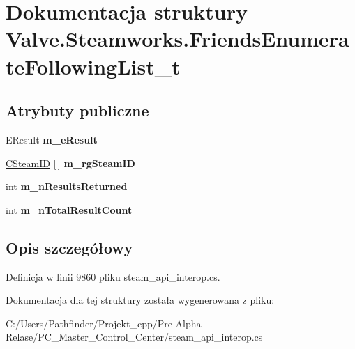 \hypertarget{struct_valve_1_1_steamworks_1_1_friends_enumerate_following_list__t}{}\section{Dokumentacja struktury Valve.\+Steamworks.\+Friends\+Enumerate\+Following\+List\+\_\+t}
\label{struct_valve_1_1_steamworks_1_1_friends_enumerate_following_list__t}
\subsection*{Atrybuty publiczne}
\begin{DoxyCompactItemize}
\item 
\mbox{\label{struct_valve_1_1_steamworks_1_1_friends_enumerate_following_list__t_a4df396a8006174ea889b055974002ef2}} 
E\+Result {\bfseries m\+\_\+e\+Result}
\item 
\mbox{\label{struct_valve_1_1_steamworks_1_1_friends_enumerate_following_list__t_a324b586ea14c2cfd6e8ed8ad3388a892}} 
\hyperlink{struct_valve_1_1_steamworks_1_1_c_steam_i_d}{C\+Steam\+ID} \mbox{[}$\,$\mbox{]} {\bfseries m\+\_\+rg\+Steam\+ID}
\item 
\mbox{\label{struct_valve_1_1_steamworks_1_1_friends_enumerate_following_list__t_ae61a7696e5eb693a8b56d9fb8a21a2bf}} 
int {\bfseries m\+\_\+n\+Results\+Returned}
\item 
\mbox{\label{struct_valve_1_1_steamworks_1_1_friends_enumerate_following_list__t_a6da1f048def18101678e861824ad9c5d}} 
int {\bfseries m\+\_\+n\+Total\+Result\+Count}
\end{DoxyCompactItemize}


\subsection{Opis szczegółowy}


Definicja w linii 9860 pliku steam\+\_\+api\+\_\+interop.\+cs.



Dokumentacja dla tej struktury została wygenerowana z pliku\+:\begin{DoxyCompactItemize}
\item 
C\+:/\+Users/\+Pathfinder/\+Projekt\+\_\+cpp/\+Pre-\/\+Alpha Relase/\+P\+C\+\_\+\+Master\+\_\+\+Control\+\_\+\+Center/steam\+\_\+api\+\_\+interop.\+cs\end{DoxyCompactItemize}
